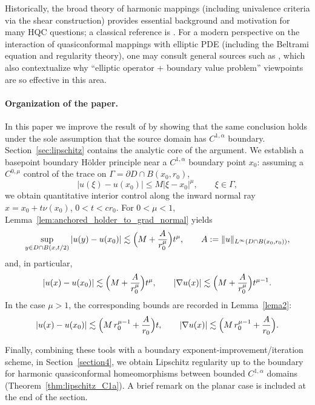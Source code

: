 \documentclass{amsart}
\begin{document}
Historically, the broad theory of harmonic mappings (including univalence criteria via the
shear construction) provides essential background and motivation for many HQC questions;
a classical reference is \cite{ClunieSheilSmall1984}. For a modern perspective on the
interaction of quasiconformal mappings with elliptic PDE (including the Beltrami equation and
regularity theory), one may consult general sources such as \cite{AstalaIwaniecMartin2009},
which also contextualize why ``elliptic operator + boundary value problem'' viewpoints are so
effective in this area.

\medskip

\paragraph{\textbf{Organization of the paper.}}
In this paper we improve the result of \cite{GjokajKalaj2022} by showing that the same conclusion holds
under the sole assumption that the source domain has $C^{1,\alpha}$ boundary.
Section~\ref{sec:lipschitz} contains the analytic core of the argument.
We establish a basepoint boundary H\"older principle near a $C^{1,\alpha}$ boundary point $x_0$:
assuming a $C^{0,\mu}$ control of the trace on $\Gamma=\partial D\cap B(x_0,r_0)$,
\[
|u(\xi)-u(x_0)|\le M|\xi-x_0|^\mu,\qquad \xi\in\Gamma,
\]
we obtain quantitative interior control along the inward normal ray
$x=x_0+t\nu(x_0)$, $0<t<cr_0$. For $0<\mu<1$, Lemma~\ref{lem:anchored_holder_to_grad_normal} yields
\[
\sup_{y\in D\cap B(x,t/2)}|u(y)-u(x_0)|
\lesssim \Bigl(M+\frac{A}{r_0^\mu}\Bigr)t^\mu,
\qquad A:=\|u\|_{L^\infty(D\cap B(x_0,r_0))},
\]
and, in particular,
\[
|u(x)-u(x_0)|\lesssim \Bigl(M+\frac{A}{r_0^\mu}\Bigr)t^\mu,
\qquad
|\nabla u(x)|\lesssim \Bigl(M+\frac{A}{r_0^\mu}\Bigr)t^{\mu-1}.
\]
In the case $\mu>1$, the corresponding bounds are recorded in Lemma~\ref{lema2}:
\[
|u(x)-u(x_0)|\lesssim \Bigl(M\,r_0^{\mu-1}+\frac{A}{r_0}\Bigr)t,
\qquad
|\nabla u(x)|\lesssim \Bigl(M\,r_0^{\mu-1}+\frac{A}{r_0}\Bigr).
\]



Finally, combining these tools with a boundary exponent-improvement/iteration scheme, in Section~\ref{section4},
we obtain Lipschitz regularity up to the boundary for harmonic quasiconformal homeomorphisms
between bounded $C^{1,\alpha}$ domains (Theorem~\ref{thm:lipschitz_C1a}).
A brief remark on the planar case is included at the end of the section.

\medskip
\end{document}
